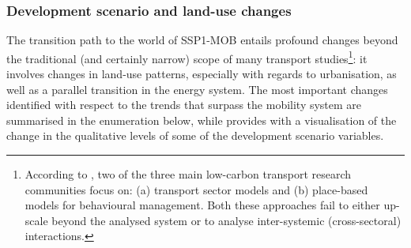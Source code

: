 \subsubsection*{Development scenario and land-use changes}
The transition path to the world of SSP1-MOB entails profound changes beyond the traditional (and certainly narrow) scope of many transport studies\footnote{According to \textcite{creutzig2015_EvolvingNarrativesLow}, two of the three main low-carbon transport research communities focus on: (a) transport sector models and (b) place-based models for behavioural management. Both these approaches fail to either up-scale beyond the analysed system or to analyse inter-systemic (cross-sectoral) interactions.}: it involves changes in land-use patterns, especially with regards to urbanisation, as well as a parallel transition in the energy system. The most important changes identified with respect to the trends that surpass the mobility system are summarised in the enumeration below, while  provides with a visualisation of the change in the qualitative levels of some of the development scenario variables.
%
